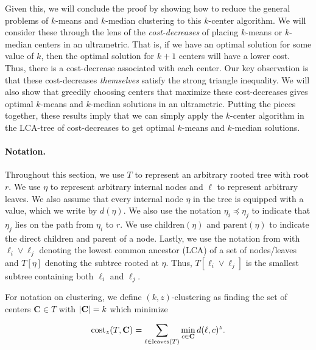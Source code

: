 
Given this, we will conclude the proof by showing how to reduce the general problems of $k$-means and $k$-median clustering to this $k$-center algorithm.
We will consider these through the lens of the \emph{cost-decreases} of placing $k$-means or $k$-median centers in an ultrametric. That is, if we have an optimal solution for some value of $k$, then the optimal solution for $k+1$ centers will have a lower cost. Thus, there is a cost-decrease associated with each center. Our key observation is that these cost-decreases \emph{themselves} satisfy the strong triangle inequality.
We will also show that greedily choosing centers that maximize these cost-decreases gives optimal $k$-means and $k$-median solutions in an ultrametric. Putting the pieces together, these
results imply that we can simply apply the $k$-center algorithm in the LCA-tree of cost-decreases to get optimal $k$-means and $k$-median solutions.

\paragraph{Notation.} Throughout this section, we use $T$ to represent an arbitrary rooted tree with root $r$. We use $\eta$ to represent arbitrary internal
nodes and $\ell$ to represent arbitrary leaves. We also assume that every internal node $\eta$ in the tree is equipped with a value, which we write by
$d(\eta)$. We also use the notation $\eta_i \preceq \eta_j$ to indicate that $\eta_j$ lies on the path from $\eta_i$ to $r$.
We use $\text{children}(\eta)$ and
$\text{parent}(\eta)$ to indicate the direct children and parent of a node. Lastly, we use the notation from \cite{dasgupta_objective} with $\ell_i \lor \ell_j$
denoting the lowest common ancestor (LCA) of a set of nodes/leaves and $T[\eta]$ denoting the subtree rooted at $\eta$. Thus, $T[\ell_i \lor \ell_j]$ is the
smallest subtree containing both $\ell_i$ and $\ell_j$.

For notation on clustering, we define $(k, z)$-clustering as finding the set of centers $\mathbf{C} \in T$ with $|\mathbf{C}| = k$ which minimize

\[\text{cost}_z(T, \mathbf{C}) = \sum_{\ell \in \text{leaves}(T)} \min_{c \in \mathbf{C}} d(\ell, c)^z.\]

